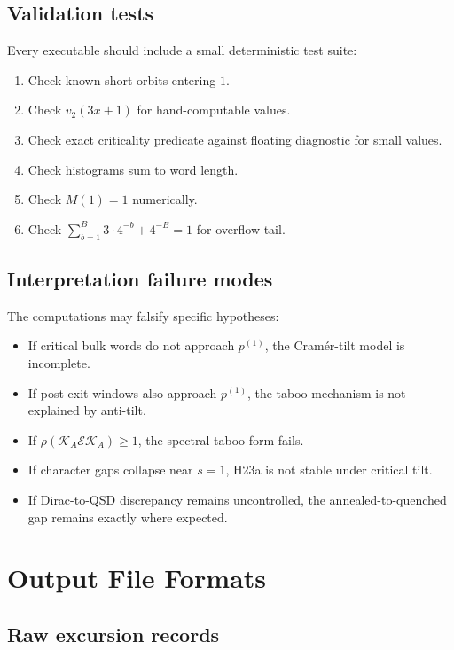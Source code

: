 \documentclass[11pt]{article}
\begin{document}
\subsection{Validation tests}

Every executable should include a small deterministic test suite:
\begin{enumerate}
  \item Check known short orbits entering $1$.
  \item Check $v_2(3x+1)$ for hand-computable values.
  \item Check exact criticality predicate against floating diagnostic for small values.
  \item Check histograms sum to word length.
  \item Check $M(1)=1$ numerically.
  \item Check $\sum_{b=1}^{B}3\cdot4^{-b}+4^{-B}=1$ for overflow tail.
\end{enumerate}

\subsection{Interpretation failure modes}

The computations may falsify specific hypotheses:
\begin{itemize}
  \item If critical bulk words do not approach $p^{(1)}$, the Cram\'er-tilt model is incomplete.
  \item If post-exit windows also approach $p^{(1)}$, the taboo mechanism is not explained by anti-tilt.
  \item If $\rho(\mathcal K_A\mathcal E\mathcal K_A)\ge1$, the spectral taboo form fails.
  \item If character gaps collapse near $s=1$, H23a is not stable under critical tilt.
  \item If Dirac-to-QSD discrepancy remains uncontrolled, the annealed-to-quenched gap remains exactly where expected.
\end{itemize}

\section{Output File Formats}

\subsection{Raw excursion records}
\end{document}
